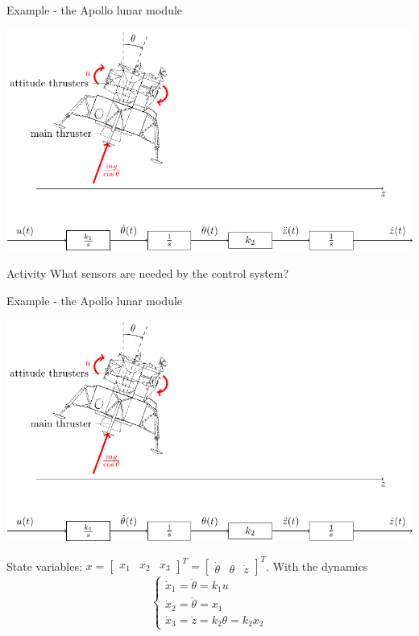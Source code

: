 \documentclass[presentation,aspectratio=1610]{beamer}
\begin{document}
\begin{frame}[label={sec:orgd29c635}]{Example - the Apollo lunar module}
\begin{center}
\includegraphics[width=0.8\linewidth]{fig-apollo}
\end{center}
\alert{Activity} What sensors are needed by the control system?
\end{frame}

\begin{frame}[label={sec:org1d01b3c}]{Example - the Apollo lunar module}
\begin{center}
\includegraphics[width=0.7\linewidth]{fig-apollo}
\end{center}

State variables: \(x = \begin{bmatrix} x_1 & x_2 & x_3 \end{bmatrix}^T = \begin{bmatrix} \dot{\theta} & \theta & \dot{z} \end{bmatrix}^T\). With the dynamics
\[ \begin{cases} \dot{x}_1 =  \ddot{\theta} = k_1 u\\ \dot{x}_2 = \dot{\theta} = x_1\\ \dot{x}_3 = \ddot{z} = k_2\theta = k_2x_2 \end{cases} \]
\end{frame}
\end{document}
